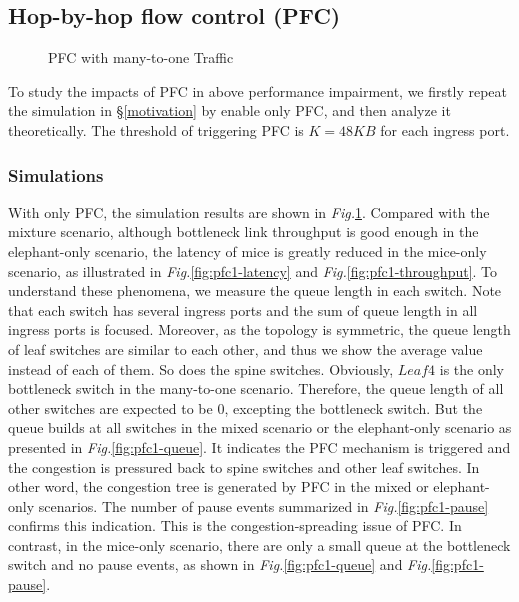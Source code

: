 \documentclass[]{sig-alternate-10pt}
\begin{document}
\subsection{Hop-by-hop flow control (PFC)}
\begin{figure}[t]
	\centering
	\hfill
	\caption{PFC with many-to-one Traffic}
	\label{fig:pfc1}
\end{figure}


To study the impacts of PFC in above performance impairment, we firstly repeat the simulation in \S\ref{motivation} by enable only PFC, and then analyze it theoretically. The threshold of triggering PFC is $K=48KB$ for each ingress port.

\subsubsection{Simulations}
With only PFC, the simulation results are shown in \emph{Fig.}\ref{fig:pfc1}. Compared with the mixture scenario, although bottleneck link throughput is good enough in the elephant-only scenario, the latency of mice is greatly reduced in the mice-only scenario, as illustrated in \emph{Fig.}\ref{fig:pfc1-latency} and \emph{Fig.}\ref{fig:pfc1-throughput}.
To understand these phenomena, we measure the queue length in each switch.
Note that each switch has several ingress ports and the sum of queue length in all ingress ports is focused.
Moreover, as the topology is symmetric, the queue length of leaf switches are similar to each other, and thus we show the average value instead of each of them. So does the spine switches.
Obviously, $Leaf4$ is the only bottleneck switch in the many-to-one scenario. Therefore, the queue length of all other switches are expected to be $0$, excepting the bottleneck switch.
But the queue builds at all switches in the mixed scenario or the elephant-only scenario as presented in \emph{Fig.}\ref{fig:pfc1-queue}.
It indicates the PFC mechanism is triggered and the congestion is pressured back to spine switches and other leaf switches. In other word, the congestion tree is generated by PFC in the mixed or elephant-only scenarios.
The number of pause events summarized in \emph{Fig.}\ref{fig:pfc1-pause} confirms this indication.
This is the congestion-spreading issue of PFC.
In contrast, in the mice-only scenario, there are only a small queue at the bottleneck switch and no pause events, as shown in \emph{Fig.}\ref{fig:pfc1-queue} and \emph{Fig.}\ref{fig:pfc1-pause}.
\end{document}
